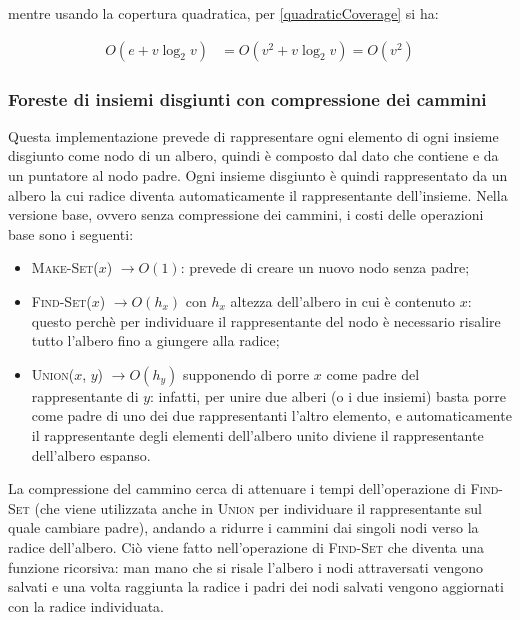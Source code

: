 mentre usando la copertura quadratica, per \eqref{quadraticCoverage} si ha:

\begin{equation}
    \label{quadraticWUH}
    \begin{aligned}
        O(e+v\log_2v) & = O(v^2+ v\log_2v) = O(v^2)
    \end{aligned}
\end{equation}

\subsubsection{Foreste di insiemi disgiunti con compressione dei cammini}
Questa implementazione prevede di rappresentare ogni elemento di ogni insieme disgiunto
come nodo di un albero, quindi è composto dal dato che contiene e da un puntatore al nodo
padre. Ogni insieme disgiunto è quindi rappresentato da un albero la cui radice diventa
automaticamente il rappresentante dell'insieme. Nella versione base, ovvero senza compressione
dei cammini, i costi delle operazioni base sono i seguenti:

\begin{itemize}
    \item \textsc{Make-Set($x$)} $\rightarrow O(1)$: prevede di creare un nuovo nodo senza padre;
    \item \textsc{Find-Set($x$)} $\rightarrow O(h_x)$ con $h_x$ altezza dell'albero in cui è contenuto $x$:
          questo perchè per individuare il rappresentante del nodo è necessario risalire tutto l'albero
          fino a giungere alla radice;
    \item \textsc{Union($x$, $y$)} $\rightarrow O(h_y)$ supponendo di porre $x$ come padre del rappresentante
          di $y$: infatti, per unire due alberi (o i due insiemi) basta porre come padre di uno dei due rappresentanti
          l'altro elemento, e automaticamente il rappresentante degli elementi dell'albero unito diviene il
          rappresentante dell'albero espanso.
\end{itemize}

La compressione del cammino cerca di attenuare i tempi dell'operazione di \textsc{Find-Set}
(che viene utilizzata anche in \textsc{Union} per individuare il rappresentante sul quale
cambiare padre), andando a ridurre i cammini dai singoli nodi verso la radice dell'albero.
Ciò viene fatto nell'operazione di \textsc{Find-Set} che diventa una funzione ricorsiva: man
mano che si risale l'albero i nodi attraversati vengono salvati e una volta raggiunta la radice
i padri dei nodi salvati vengono aggiornati con la radice individuata.\newline

